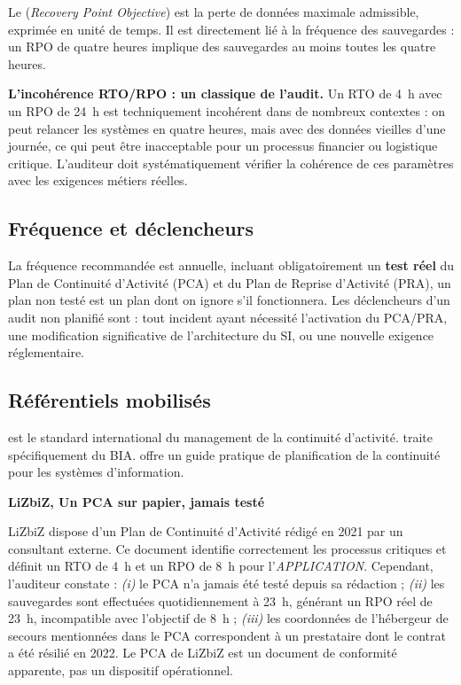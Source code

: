 Le  (\textit{Recovery Point Objective}) est la perte de données maximale admissible, exprimée en unité de temps. Il est directement lié à la fréquence des sauvegardes : un RPO de quatre heures implique des sauvegardes au moins toutes les quatre heures.

\begin{boxalert}
\textbf{L'incohérence RTO/RPO : un classique de l'audit.} Un RTO de 4~h avec un RPO de 24~h est techniquement incohérent dans de nombreux contextes : on peut relancer les systèmes en quatre heures, mais avec des données vieilles d'une journée, ce qui peut être inacceptable pour un processus financier ou logistique critique. L'auditeur doit systématiquement vérifier la cohérence de ces paramètres avec les exigences métiers réelles.
\end{boxalert}

\subsection{Fréquence et déclencheurs}

La fréquence recommandée est annuelle, incluant obligatoirement un \textbf{test réel} du Plan de Continuité d'Activité (PCA) et du Plan de Reprise d'Activité (PRA), un plan non testé est un plan dont on ignore s'il fonctionnera. Les déclencheurs d'un audit non planifié sont : tout incident ayant nécessité l'activation du PCA/PRA, une modification significative de l'architecture du SI, ou une nouvelle exigence réglementaire.

\subsection{Référentiels mobilisés}

 est le standard international du management de la continuité d'activité.  traite spécifiquement du BIA.  offre un guide pratique de planification de la continuité pour les systèmes d'information.

\begin{boxlizbiz}
\textbf{LiZbiZ, Un PCA sur papier, jamais testé}

LiZbiZ dispose d'un Plan de Continuité d'Activité rédigé en 2021 par un consultant externe. Ce document identifie correctement les processus critiques et définit un RTO de 4~h et un RPO de 8~h pour l'\textit{APPLICATION}. Cependant, l'auditeur constate : \textit{(i)} le PCA n'a jamais été testé depuis sa rédaction ; \textit{(ii)} les sauvegardes sont effectuées quotidiennement à 23~h, générant un RPO réel de 23~h, incompatible avec l'objectif de 8~h ; \textit{(iii)} les coordonnées de l'hébergeur de secours mentionnées dans le PCA correspondent à un prestataire dont le contrat a été résilié en 2022. Le PCA de LiZbiZ est un document de conformité apparente, pas un dispositif opérationnel.
\end{boxlizbiz}


